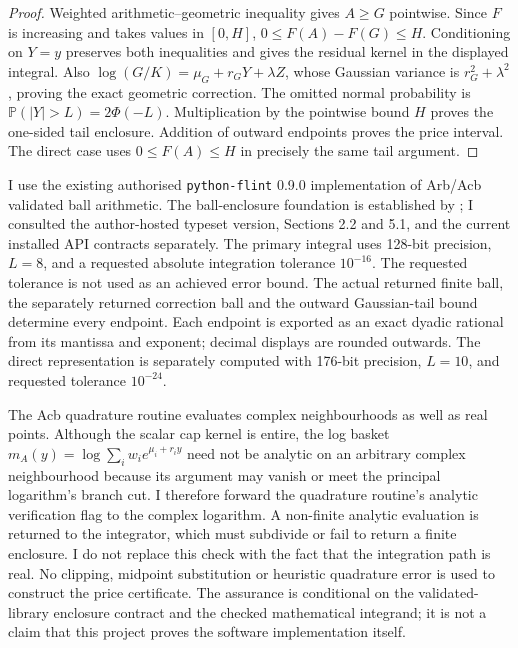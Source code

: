 \begin{proof}
Weighted arithmetic--geometric inequality gives \(A\geq G\) pointwise. Since
\(F\) is increasing and takes values in \([0,H]\),
\(0\leq F(A)-F(G)\leq H\). Conditioning on \(Y=y\) preserves both
inequalities and gives the residual kernel in the displayed integral.
Also \(\log(G/K)=\mu_G+r_GY+\lambda Z\), whose Gaussian variance is
\(r_G^2+\lambda^2\), proving the exact geometric correction.
The omitted normal probability is
\(\mathbb P(|Y|>L)=2\Phi(-L)\). Multiplication by the pointwise bound \(H\)
proves the one-sided tail enclosure. Addition of outward endpoints proves the
price interval. The direct case uses \(0\leq F(A)\leq H\) in precisely the
same tail argument.
\end{proof}

I use the existing authorised \texttt{python-flint} 0.9.0 implementation of
Arb/Acb validated ball arithmetic. The ball-enclosure foundation is established by \citet{johansson2017}; I consulted the author-hosted typeset version, Sections 2.2 and 5.1, and the current installed API contracts separately. The primary integral uses 128-bit precision,
\(L=8\), and a requested absolute integration tolerance \(10^{-16}\).
The requested tolerance is not used as an achieved error bound. The actual
returned finite ball, the separately returned correction ball and the outward
Gaussian-tail bound determine every endpoint. Each endpoint is exported as an
exact dyadic rational from its mantissa and exponent; decimal displays are
rounded outwards. The direct representation is separately computed with
176-bit precision, \(L=10\), and requested tolerance \(10^{-24}\).

The Acb quadrature routine evaluates complex neighbourhoods as well as real
points. Although the scalar cap kernel is entire, the log basket
\(m_A(y)=\log\sum_iw_i e^{\mu_i+r_iy}\) need not be analytic on an arbitrary
complex neighbourhood because its argument may vanish or meet the principal
logarithm's branch cut. I therefore forward the quadrature routine's analytic
verification flag to the complex logarithm. A non-finite analytic evaluation is
returned to the integrator, which must subdivide or fail to return a finite
enclosure. I do not replace this check with the fact that the integration path
is real. No clipping, midpoint substitution or heuristic quadrature error is
used to construct the price certificate. The assurance is conditional on the
validated-library enclosure contract and the checked mathematical integrand;
it is not a claim that this project proves the software implementation itself.

